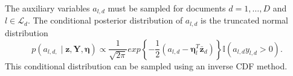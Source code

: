 The auxiliary variables $a_{l,d}$ must be sampled for documents $d=1,\ldots,D$
and $l\in\mathcal{L}_{d}$. The conditional posterior distribution
of $a_{l,d}$ is the truncated normal distribution \begin{equation}
p\left(a_{l,d,}\mid\mathbf{z},\mathbf{Y},\mathbf{\boldsymbol\eta}\right)\propto\frac{1}{\sqrt{2\pi}}exp\left\{ -\frac{1}{2}\left(a_{l,d}-\boldsymbol\eta_{l}^{T}\mathbf{\bar{z}}_{d}\right)\right\} \mathbb{I}\left(a_{l,d}y_{l,d}>0\right).\end{equation}
 This conditional distribution can be sampled using an inverse CDF
method. %

